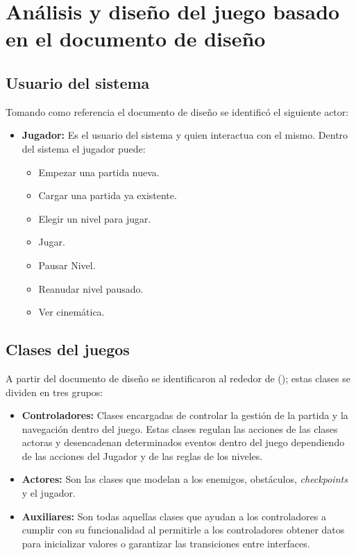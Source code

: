 \section{Análisis y diseño del juego basado en el documento de diseño}	
	\subsection{Usuario del sistema}
	Tomando como referencia el documento de diseño se identificó el siguiente actor:
	\begin{itemize}
		\item \textbf{Jugador:} Es el usuario del sistema y quien interactua con
		el mismo. Dentro del sistema el jugador puede: 
			\begin{itemize}
				\item Empezar una partida nueva.	
				\item Cargar una partida ya existente.
				\item Elegir un nivel para jugar.  
				\item Jugar.
				\item Pausar Nivel.
				\item Reanudar nivel pausado.
				\item Ver cinemática.
			\end{itemize}			   
	\end{itemize}	
	
	\subsection{Clases del juegos}
	A partir del documento de diseño se identificaron al rededor de (); estas 
	clases se dividen en tres grupos:
		\begin{itemize}
			\item \textbf{Controladores:} Clases encargadas de controlar la gestión de 
			la partida y la navegación dentro del juego. Estas clases regulan las acciones 
			de las clases actoras y desencadenan determinados eventos dentro del juego
			dependiendo de las acciones del Jugador y de las reglas de los niveles.
			
			\item \textbf{Actores:} Son las clases que modelan a los enemigos, obstáculos,
			\textit{checkpoints} y el jugador.
			 
			 \item \textbf{Auxiliares:} Son todas aquellas clases que ayudan a los controladores
			 a cumplir con su funcionalidad al permitirle a los controladores obtener datos 
			 para inicializar valores o garantizar las transiciones entre interfaces.
		\end{itemize}
		
